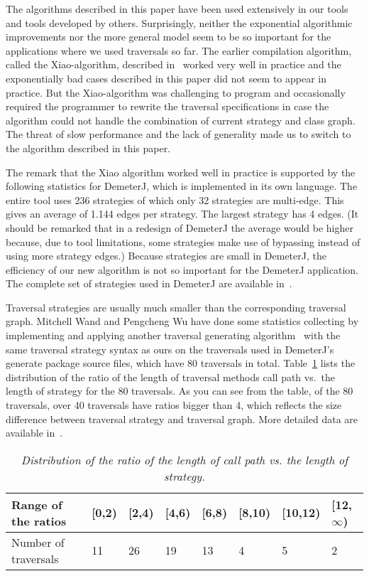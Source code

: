 The algorithms described in this paper have been used extensively in
our tools and tools developed by others. Surprisingly, neither the
exponential algorithmic improvements nor the more general model seem
to be so important for the applications where we used traversals so
far. The earlier compilation algorithm, called the Xiao-algorithm,
described in~\cite{lieber-palsberg-xiao94} worked very well in
practice and the exponentially bad cases described in this paper did
not seem to appear in practice.  But the Xiao-algorithm was
challenging to program and occasionally required the programmer to
rewrite the traversal specifications in case the algorithm could not
handle the combination of current strategy and class graph. The threat
of slow performance and the lack of generality made us to switch to
the algorithm described in this paper.

The remark that the Xiao algorithm worked well in practice is
supported by the following statistics for DemeterJ, which is
implemented in its own language.  The entire tool uses 236 strategies
of which only 32 strategies are multi-edge. This gives an average of
1.144 edges per strategy. The largest strategy has 4 edges. (It should
be remarked that in a redesign of DemeterJ the average would be higher
because, due to tool limitations, some strategies make use of
bypassing instead of using more strategy edges.)  Because strategies
are small in DemeterJ, the efficiency of our new algorithm is not so
important for the DemeterJ application.  The complete set of
strategies used in DemeterJ are available in~\cite{DemeterJstats}.

Traversal strategies are usually much smaller than the corresponding
traversal graph.  Mitchell Wand and Pengcheng Wu have done some
statistics collecting by implementing and applying another traversal
generating algorithm~\cite{mitch:karl-2000} with the same traversal
strategy syntax as ours on the traversals used in DemeterJ's
{\sf generate} package source files, which have 80 traversals in
total.  Table~\ref{table:ratio} lists the distribution of the ratio of
the length of traversal methods call path vs.~the length of strategy
for the 80 traversals.  As you can see from the table, of the 80
traversals, over 40 traversals have ratios bigger than 4, which
reflects the size difference between traversal strategy and traversal
graph.  More detailed data are available in~\cite{PengchengStats}.

\begin{table}[h]
\begin{center}
\begin{tabular}{|l||l|l|l|l|l|l|l|}
\hline
Range of the ratios & [0,2) & [2,4) & [4,6) & [6,8) & [8,10) & [10,12)
& [12,$\infty$) \\
\hline
Number of traversals & 11 & 26 & 19 & 13 & 4 & 5 & 2\\
\hline
\end{tabular}
\end{center}
\caption{\em Distribution of the ratio of the length of call path vs. the
length of strategy.}
\label{table:ratio}
\end{table}

